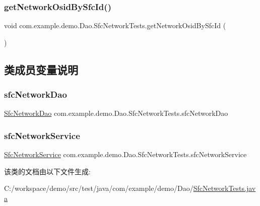 \subsubsection{\texorpdfstring{get\+Network\+Osid\+By\+Sfc\+Id()}{getNetworkOsidBySfcId()}}
{\footnotesize\ttfamily void com.\+example.\+demo.\+Dao.\+Sfc\+Network\+Tests.\+get\+Network\+Osid\+By\+Sfc\+Id (\begin{DoxyParamCaption}{ }\end{DoxyParamCaption})}



\subsection{类成员变量说明}
\mbox{\label{classcom_1_1example_1_1demo_1_1_dao_1_1_sfc_network_tests_a2b56954b46078334dcae67e43880b0b1}} 
\subsubsection{\texorpdfstring{sfc\+Network\+Dao}{sfcNetworkDao}}
{\footnotesize\ttfamily \mbox{\hyperlink{interfacecom_1_1example_1_1demo_1_1dao_1_1_sfc_network_dao}{Sfc\+Network\+Dao}} com.\+example.\+demo.\+Dao.\+Sfc\+Network\+Tests.\+sfc\+Network\+Dao\hspace{0.3cm}{\ttfamily [package]}}

\mbox{\label{classcom_1_1example_1_1demo_1_1_dao_1_1_sfc_network_tests_ab72070f5d32a3163e054c7ea79de55c3}} 
\subsubsection{\texorpdfstring{sfc\+Network\+Service}{sfcNetworkService}}
{\footnotesize\ttfamily \mbox{\hyperlink{classcom_1_1example_1_1demo_1_1service_1_1_sfc_network_service}{Sfc\+Network\+Service}} com.\+example.\+demo.\+Dao.\+Sfc\+Network\+Tests.\+sfc\+Network\+Service\hspace{0.3cm}{\ttfamily [package]}}



该类的文档由以下文件生成\+:\begin{DoxyCompactItemize}
\item 
C\+:/workspace/demo/src/test/java/com/example/demo/\+Dao/\mbox{\hyperlink{_sfc_network_tests_8java}{Sfc\+Network\+Tests.\+java}}\end{DoxyCompactItemize}
